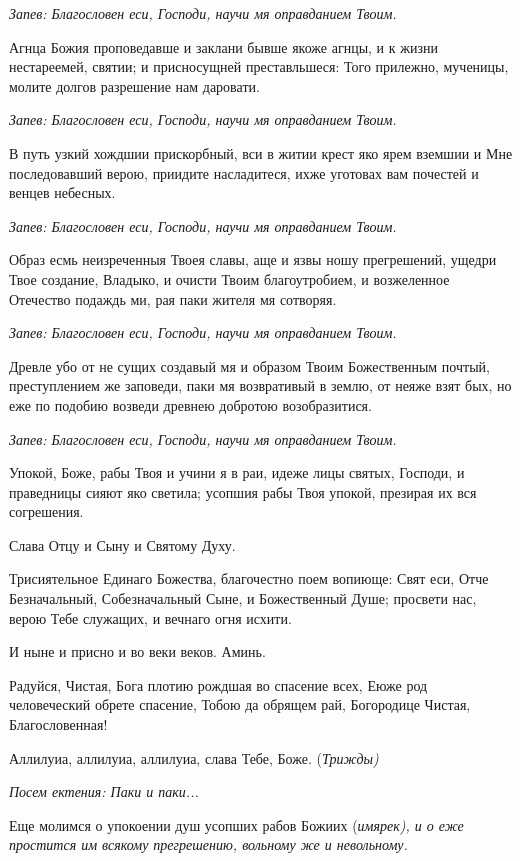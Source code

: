 \itshape Запев:\normalfont{} Благословен еси, Господи, научи мя оправданием Твоим. 

Агнца Божия проповедавше и заклани бывше якоже агнцы, и к жизни нестареемей, святии; и присносущней преставльшеся: Того прилежно, мученицы, молите долгов разрешение нам даровати. 

\itshape Запев:\normalfont{} Благословен еси, Господи, научи мя оправданием Твоим. 

В путь узкий хождшии прискорбный, вси в житии крест яко ярем вземшии и Мне последовавший верою, приидите насладитеся, ихже уготовах вам почестей и венцев небесных. 

\itshape Запев:\normalfont{} Благословен еси, Господи, научи мя оправданием Твоим. 

Образ есмь неизреченныя Твоея славы, аще и язвы ношу прегрешений, ущедри Твое создание, Владыко, и очисти Твоим благоутробием, и возжеленное Отечество подаждь ми, рая паки жителя мя сотворяя. 

\itshape Запев:\normalfont{} Благословен еси, Господи, научи мя оправданием Твоим. 

Древле убо от не сущих создавый мя и образом Твоим Божественным почтый, преступлением же заповеди, паки мя возвративый в землю, от неяже взят бых, но еже по подобию возведи древнею добротою возобразитися. 

\itshape Запев:\normalfont{} Благословен еси, Господи, научи мя оправданием Твоим. 

Упокой, Боже, рабы Твоя и учини я в раи, идеже лицы святых, Господи, и праведницы сияют яко светила; усопшия рабы Твоя упокой, презирая их вся согрешения. 

Слава Отцу и Сыну и Святому Духу. 

Трисиятельное Единаго Божества, благочестно поем вопиюще: Свят еси, Отче Безначальный, Собезначальный Сыне, и Божественный Душе; просвети нас, верою Тебе служащих, и вечнаго огня исхити. 

И ныне и присно и во веки веков. Аминь. 

Радуйся, Чистая, Бога плотию рождшая во спасение всех, Еюже род человеческий обрете спасение, Тобою да обрящем рай, Богородице Чистая, Благословенная! 

Аллилуиа, аллилуиа, аллилуиа, слава Тебе, Боже. (\itshape Трижды\normalfont{}) 

\itshape Посем ектения:\normalfont{} Паки и паки... 

Еще молимся о упокоении душ усопших рабов Божиих (\itshape имярек\normalfont{}), и о еже простится им всякому прегрешению, вольному же и невольному. 


